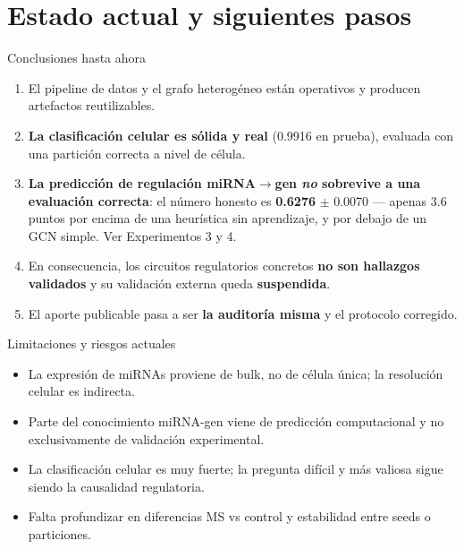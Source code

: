 \section{Estado actual y siguientes pasos}

\begin{frame}{Conclusiones hasta ahora}
  \begin{enumerate}
    \item El pipeline de datos y el grafo heterog\'eneo est\'an operativos y producen artefactos reutilizables.
    \item \textbf{La clasificaci\'on celular es s\'olida y real} (0.9916 en prueba), evaluada con una partici\'on correcta a nivel de c\'elula.
    \item \textbf{La predicci\'on de regulaci\'on miRNA$\to$gen \emph{no} sobrevive a una evaluaci\'on correcta}: el n\'umero honesto es \textbf{0.6276} $\pm$ 0.0070 --- apenas 3.6 puntos por encima de una heur\'istica sin aprendizaje, y por debajo de un GCN simple. Ver Experimentos 3 y 4.
    \item En consecuencia, los circuitos regulatorios concretos \textbf{no son hallazgos validados} y su validaci\'on externa queda \textbf{suspendida}.
    \item El aporte publicable pasa a ser \textbf{la auditor\'ia misma} y el protocolo corregido.
  \end{enumerate}
\end{frame}

\begin{frame}{Limitaciones y riesgos actuales}
  \begin{itemize}
    \item La expresi\'on de miRNAs proviene de bulk, no de c\'elula \'unica; la resoluci\'on celular es indirecta.
    \item Parte del conocimiento miRNA-gen viene de predicci\'on computacional y no exclusivamente de validaci\'on experimental.
    \item La clasificaci\'on celular es muy fuerte; la pregunta dif\'icil y m\'as valiosa sigue siendo la causalidad regulatoria.
    \item Falta profundizar en diferencias MS vs control y estabilidad entre seeds o particiones.
  \end{itemize}
\end{frame}

